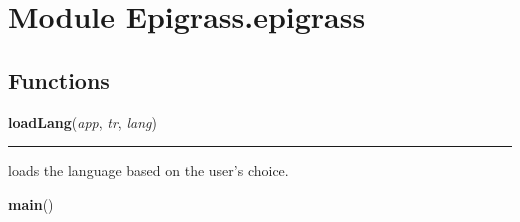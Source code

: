 %
%
%


\section{Module Epigrass.epigrass}

    \label{Epigrass:epigrass}


  \subsection{Functions}

    \label{Epigrass:epigrass:loadLang}

    \vspace{0.5ex}

    \begin{boxedminipage}{\textwidth}

    \raggedright \textbf{loadLang}(\textit{app}, \textit{tr}, \textit{lang})

    \vspace{-1.5ex}

    \rule{\textwidth}{0.5\fboxrule}
    loads the language based on the user's choice.

    \vspace{1ex}

    \end{boxedminipage}

    \label{Epigrass:epigrass:main}

    \vspace{0.5ex}

    \begin{boxedminipage}{\textwidth}

    \raggedright \textbf{main}()

    \end{boxedminipage}


